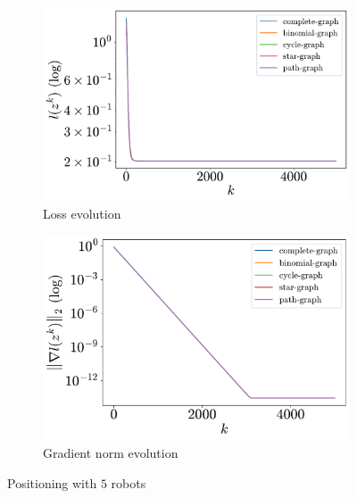 \documentclass[a4paper,11pt,oneside]{book}
\begin{document}
\begin{figure}[H]
      \centering
      \begin{subfigure}[t]{0.46\linewidth}
            \centering
            \includegraphics[width=\linewidth]{./figs/aggregative/few_agents/loss.pdf} 
            \caption{Loss evolution}
      \end{subfigure}
      \hfill
      \begin{subfigure}[t]{0.46\linewidth}
            \centering
            \includegraphics[width=\linewidth]{./figs/aggregative/few_agents/gradient.pdf} 
            \caption{Gradient norm evolution}
      \end{subfigure}
      \caption{Positioning with $5$ robots}
      \label{fig:positioning_5}
\end{figure}
\end{document}

